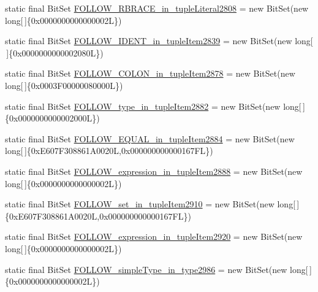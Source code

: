 \begin{DoxyCompactItemize}
\item 
static final Bit\-Set \hyperlink{classorg_1_1tzi_1_1use_1_1parser_1_1ocl_1_1_o_c_l_parser_a254b37153e8a6cd6c0a8c7ce011485b3}{F\-O\-L\-L\-O\-W\-\_\-\-R\-B\-R\-A\-C\-E\-\_\-in\-\_\-tuple\-Literal2808} = new Bit\-Set(new long\mbox{[}$\,$\mbox{]}\{0x0000000000000002\-L\})
\item 
static final Bit\-Set \hyperlink{classorg_1_1tzi_1_1use_1_1parser_1_1ocl_1_1_o_c_l_parser_a6ed535695dc3c53a823208fdd541c43d}{F\-O\-L\-L\-O\-W\-\_\-\-I\-D\-E\-N\-T\-\_\-in\-\_\-tuple\-Item2839} = new Bit\-Set(new long\mbox{[}$\,$\mbox{]}\{0x0000000000002080\-L\})
\item 
static final Bit\-Set \hyperlink{classorg_1_1tzi_1_1use_1_1parser_1_1ocl_1_1_o_c_l_parser_a44ba06ae531d25452699dba792fdd852}{F\-O\-L\-L\-O\-W\-\_\-\-C\-O\-L\-O\-N\-\_\-in\-\_\-tuple\-Item2878} = new Bit\-Set(new long\mbox{[}$\,$\mbox{]}\{0x0003\-F00000080000\-L\})
\item 
static final Bit\-Set \hyperlink{classorg_1_1tzi_1_1use_1_1parser_1_1ocl_1_1_o_c_l_parser_af1abedbf3612fe3f89134b531bb49f04}{F\-O\-L\-L\-O\-W\-\_\-type\-\_\-in\-\_\-tuple\-Item2882} = new Bit\-Set(new long\mbox{[}$\,$\mbox{]}\{0x0000000000002000\-L\})
\item 
static final Bit\-Set \hyperlink{classorg_1_1tzi_1_1use_1_1parser_1_1ocl_1_1_o_c_l_parser_a310a8f27a14ec58ff91b18d875e7b399}{F\-O\-L\-L\-O\-W\-\_\-\-E\-Q\-U\-A\-L\-\_\-in\-\_\-tuple\-Item2884} = new Bit\-Set(new long\mbox{[}$\,$\mbox{]}\{0x\-E607\-F308861\-A0020\-L,0x000000000000167\-F\-L\})
\item 
static final Bit\-Set \hyperlink{classorg_1_1tzi_1_1use_1_1parser_1_1ocl_1_1_o_c_l_parser_a1130ae39513ed22959cf806237138ab0}{F\-O\-L\-L\-O\-W\-\_\-expression\-\_\-in\-\_\-tuple\-Item2888} = new Bit\-Set(new long\mbox{[}$\,$\mbox{]}\{0x0000000000000002\-L\})
\item 
static final Bit\-Set \hyperlink{classorg_1_1tzi_1_1use_1_1parser_1_1ocl_1_1_o_c_l_parser_af5e971cc8ed1e0bfcf1fc957a7601960}{F\-O\-L\-L\-O\-W\-\_\-set\-\_\-in\-\_\-tuple\-Item2910} = new Bit\-Set(new long\mbox{[}$\,$\mbox{]}\{0x\-E607\-F308861\-A0020\-L,0x000000000000167\-F\-L\})
\item 
static final Bit\-Set \hyperlink{classorg_1_1tzi_1_1use_1_1parser_1_1ocl_1_1_o_c_l_parser_a8e1fb909b23c564290cd5cb3944951c7}{F\-O\-L\-L\-O\-W\-\_\-expression\-\_\-in\-\_\-tuple\-Item2920} = new Bit\-Set(new long\mbox{[}$\,$\mbox{]}\{0x0000000000000002\-L\})
\item 
static final Bit\-Set \hyperlink{classorg_1_1tzi_1_1use_1_1parser_1_1ocl_1_1_o_c_l_parser_a4dcd7d78bbc7e9fd4fa99cea16f0e0f5}{F\-O\-L\-L\-O\-W\-\_\-simple\-Type\-\_\-in\-\_\-type2986} = new Bit\-Set(new long\mbox{[}$\,$\mbox{]}\{0x0000000000000002\-L\})

\end{DoxyCompactItemize}
